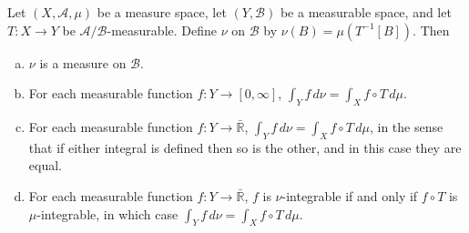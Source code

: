 \documentclass{article}
\newcommand{\R}{\mathbb{R}}
\theoremstyle{definition}
\begin{document}
Let $(X, \mathscr{A}, \mu)$ be a measure space, let $(Y, \mathscr{B})$ be a measurable space, and let $T : X \longrightarrow Y$ be $\mathscr{A}/\mathscr{B}$-measurable.
Define $\nu$ on $\mathscr{B}$ by $\nu(B) = \mu(T^{-1}[B])$. Then
\begin{enumerate}[(a)]
    \item $\nu$ is a measure on $\mathscr{B}$.
    \item For each measurable function $f : Y \longrightarrow [0,\infty]$, $\int_Y f\,d\nu = \int_X f \circ T \,d\mu$.
    \item For each measurable function $f : Y \longrightarrow \bar{\R}$, $\int_Y f\,d\nu = \int_X f \circ T\,d\mu$, in the sense that if either integral is defined then so is the other, and in this case they are equal.
    \item For each measurable function $f : Y \longrightarrow \bar{\R}$, $f$ is $\nu$-integrable if and only if $f \circ T$ is $\mu$-integrable, in which case $\int_Y f\,d\nu = \int_X f \circ T \,d\mu$.
\end{enumerate}
\end{document}
